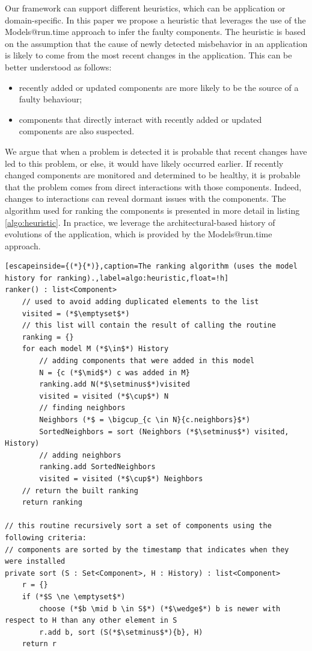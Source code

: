 Our framework can support different heuristics, which can be application or domain-specific.
In this paper we propose a heuristic that leverages the use of the Models@run.time approach to infer the faulty components.
The heuristic is based on the assumption that the cause of newly detected misbehavior in an application is likely to come from the most recent changes in the application.
This can be better understood as follows:
\begin{itemize}
\leftskip -.2in
  \item recently added or updated components are more likely to be the source of a faulty behaviour;
  \item components that directly interact with recently added or updated components are also suspected.
\end{itemize}

We argue that when a problem is detected it is probable that recent changes have led to this problem, or else, it would have likely occurred earlier.
If recently changed components are monitored and determined to be healthy, it is probable that the problem comes from direct interactions with those components.
Indeed, changes to interactions can reveal dormant issues with the components.
The algorithm used for ranking the components is presented in more detail in listing \ref{algo:heuristic}.
In practice, we leverage the architectural-based history of evolutions of the application, which is provided by the Models@run.time approach.


\begin{lstlisting}[escapeinside={(*}{*)},caption=The ranking algorithm (uses the model history for ranking).,label=algo:heuristic,float=!h]
ranker() : list<Component>
	// used to avoid adding duplicated elements to the list
	visited = (*$\emptyset$*)
	// this list will contain the result of calling the routine
	ranking = {}
	for each model M (*$\in$*) History
		// adding components that were added in this model
		N = {c (*$\mid$*) c was added in M}
		ranking.add N(*$\setminus$*)visited
		visited = visited (*$\cup$*) N
		// finding neighbors
		Neighbors (*$ = \bigcup_{c \in N}{c.neighbors}$*)
		SortedNeighbors = sort (Neighbors (*$\setminus$*) visited, History)
		// adding neighbors
		ranking.add SortedNeighbors
		visited = visited (*$\cup$*) Neighbors
	// return the built ranking
	return ranking

// this routine recursively sort a set of components using the following criteria:
// components are sorted by the timestamp that indicates when they were installed
private sort (S : Set<Component>, H : History) : list<Component>
	r = {}
	if (*$S \ne \emptyset$*)
		choose (*$b \mid b \in S$*) (*$\wedge$*) b is newer with respect to H than any other element in S
		r.add b, sort (S(*$\setminus$*){b}, H)
	return r
\end{lstlisting}

